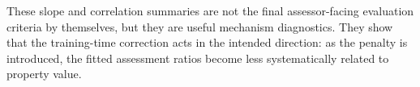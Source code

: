 \documentclass[12pt, draft]{article}
\theoremstyle{plain}
\theoremstyle{definition}
\newcommand{\1}{\mathbf{1}}
\begin{document}
These slope and correlation summaries are not the final assessor-facing evaluation criteria by themselves, but they are useful mechanism diagnostics. They show that the training-time correction acts in the intended direction: as the penalty is introduced, the fitted assessment ratios become less systematically related to property value.


\end{document}
